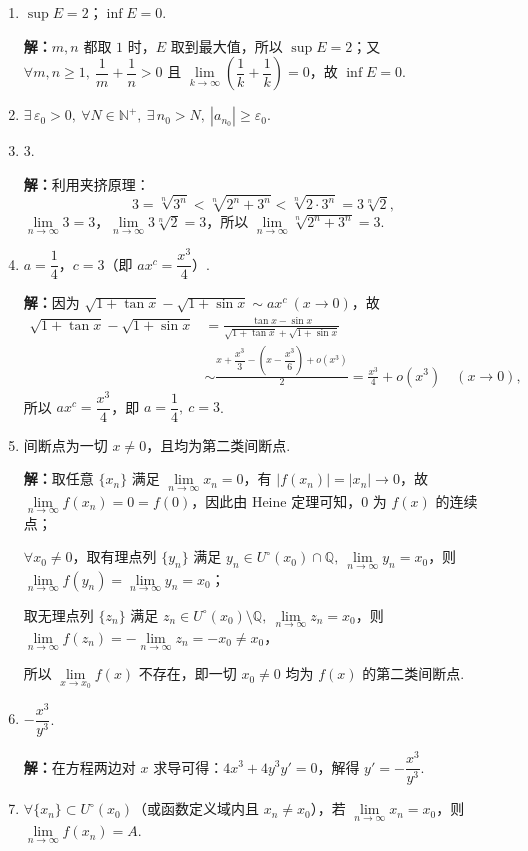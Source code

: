 \documentclass[a4paper,11pt]{ctexart}
\begin{document}
\begin{enumerate}[label=\arabic*., leftmargin=2em, itemsep=0.75em, topsep=0.4em]
  \item $\sup E=2$；$\inf E=0$.

  \textbf{解：}$m,n$ 都取 $1$ 时，$E$ 取到最大值，所以 $\sup E=2$；又 $\forall m,n\ge 1,\ \dfrac{1}{m}+\dfrac{1}{n}>0$ 且 $\lim\limits_{k\to\infty}\left(\dfrac{1}{k}+\dfrac{1}{k}\right)=0$，故 $\inf E=0$.

  \item $\exists\,\varepsilon_0>0,\ \forall N\in\mathbb{N}^+,\ \exists\,n_0>N,\ |a_{n_0}|\ge\varepsilon_0$.

  \item $3$.

  \textbf{解：}利用夹挤原理：
  \[
    3=\sqrt[n]{3^n}<\sqrt[n]{2^n+3^n}<\sqrt[n]{2\cdot 3^n}=3\sqrt[n]{2},
  \]
  $\lim\limits_{n\to\infty}3=3$，$\lim\limits_{n\to\infty}3\sqrt[n]{2}=3$，所以 $\lim\limits_{n\to\infty}\sqrt[n]{2^n+3^n}=3$.

  \item $a=\dfrac{1}{4}$，$c=3$（即 $ax^c=\dfrac{x^3}{4}$）.

  \textbf{解：}因为 $\sqrt{1+\tan x}-\sqrt{1+\sin x}\sim ax^c\ (x\to 0)$，故
  \begin{align*}
    \sqrt{1+\tan x}-\sqrt{1+\sin x}
    &= \frac{\tan x-\sin x}{\sqrt{1+\tan x}+\sqrt{1+\sin x}} \\
    &\sim \frac{x+\dfrac{x^3}{3}-\left(x-\dfrac{x^3}{6}\right)+o(x^3)}{2}
    = \frac{x^3}{4}+o(x^3)\quad (x\to 0),
  \end{align*}
  所以 $ax^c=\dfrac{x^3}{4}$，即 $a=\dfrac{1}{4},\ c=3$.

  \item 间断点为一切 $x\neq 0$，且均为第二类间断点.

  \textbf{解：}取任意 $\{x_n\}$ 满足 $\lim\limits_{n\to\infty}x_n=0$，有 $|f(x_n)|=|x_n|\to 0$，故 $\lim\limits_{n\to\infty}f(x_n)=0=f(0)$，因此由 Heine 定理可知，$0$ 为 $f(x)$ 的连续点；

  $\forall x_0\neq 0$，取有理点列 $\{y_n\}$ 满足 $y_n\in U^\circ(x_0)\cap\mathbb{Q},\ \lim\limits_{n\to\infty}y_n=x_0$，则 $\lim\limits_{n\to\infty}f(y_n)=\lim\limits_{n\to\infty}y_n=x_0$；

  取无理点列 $\{z_n\}$ 满足 $z_n\in U^\circ(x_0)\setminus\mathbb{Q},\ \lim\limits_{n\to\infty}z_n=x_0$，则 $\lim\limits_{n\to\infty}f(z_n)=-\lim\limits_{n\to\infty}z_n=-x_0\neq x_0$，

  所以 $\lim\limits_{x\to x_0}f(x)$ 不存在，即一切 $x_0\neq 0$ 均为 $f(x)$ 的第二类间断点.

  \item $-\dfrac{x^3}{y^3}$.

  \textbf{解：}在方程两边对 $x$ 求导可得：$4x^3+4y^3y'=0$，解得 $y'=-\dfrac{x^3}{y^3}$.

  \item $\forall \{x_n\}\subset U^\circ(x_0)$（或函数定义域内且 $x_n\neq x_0$），若 $\lim\limits_{n\to\infty}x_n=x_0$，则 $\lim\limits_{n\to\infty}f(x_n)=A$.
\end{enumerate}
\end{document}
